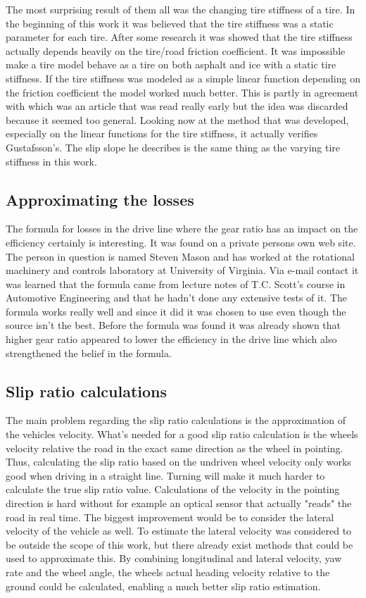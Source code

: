 The most surprising result of them all was the changing tire stiffness of a tire. In the beginning of this work it was believed that the tire stiffness was a static parameter for each tire. After some research it was showed that the tire stiffness actually depends heavily on the tire/road friction coefficient. It was impossible make a tire model behave as a tire on both asphalt and ice with a static tire stiffness. If the tire stiffness was modeled as a simple linear function depending on the friction coefficient the model worked much better. This is partly in agreement with \cite{gustafsson1997} which was an article that was read really early but the idea was discarded because it seemed too general. Looking now at the method that was developed, especially on the linear functions for the tire stiffness, it actually verifies Gustafsson's. The slip slope he describes is the same thing as the varying tire stiffness in this work.


\subsection{Approximating the losses}
The formula for losses in the drive line where the gear ratio has an impact on the efficiency certainly is interesting. It was found on a private persons own web site. The person in question is named Steven Mason and has worked at the rotational machinery and controls laboratory at University of Virginia. Via e-mail contact it was learned that the formula came from lecture notes of T.C. Scott's course in Automotive Engineering and that he hadn't done any extensive tests of it. The formula works really well and since it did it was chosen to use even though the source isn't the best. Before the formula was found it was already shown that higher gear ratio appeared to lower the efficiency in the drive line which also strengthened the belief in the formula. 

\subsection{Slip ratio calculations}
The main problem regarding the slip ratio calculations is the approximation of the vehicles velocity. What's needed for a good slip ratio calculation is the wheels velocity relative the road in the exact same direction as the wheel in pointing. Thus, calculating the slip ratio based on the undriven wheel velocity only works good when driving in a straight line. Turning will make it much harder to calculate the true slip ratio value. Calculations of the velocity in the pointing direction is hard without for example an optical sensor that actually "reads" the road in real time. The biggest improvement would be to consider the lateral velocity of the vehicle as well. To estimate the lateral velocity was considered to be outside the scope of this work, but there already exist methods that could be used to approximate this. By combining longitudinal and lateral velocity, yaw rate and the wheel angle, the wheels actual heading velocity relative to the ground could be calculated, enabling a much better slip ratio estimation.

